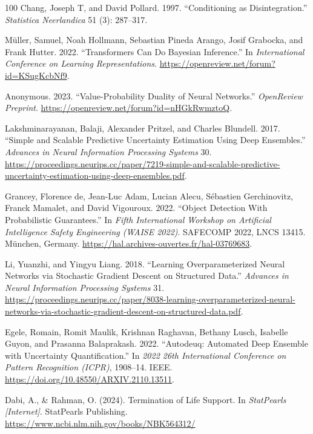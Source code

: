 \documentclass[11pt]{book}
\begin{document}
\begin{thebibliography}{100}
 Chang, Joseph T, and David Pollard. 1997. {``Conditioning as
Disintegration.''} \emph{Statistica Neerlandica} 51 (3): 287--317.

 Müller, Samuel, Noah Hollmann, Sebastian Pineda Arango, Josif Grabocka,
and Frank Hutter. 2022. {``Transformers Can Do Bayesian Inference.''} In
\emph{International Conference on Learning Representations}.
\url{https://openreview.net/forum?id=KSugKcbNf9}.

 Anonymous. 2023. {``Value-Probability Duality of Neural Networks.''}
\emph{OpenReview Preprint}.
\url{https://openreview.net/forum?id=nHGkRwmztoQ}.

 Lakshminarayanan, Balaji, Alexander Pritzel, and Charles Blundell. 2017.
{``Simple and Scalable Predictive Uncertainty Estimation Using Deep
Ensembles.''} \emph{Advances in Neural Information Processing Systems}
30.
\url{https://proceedings.neurips.cc/paper/7219-simple-and-scalable-predictive-uncertainty-estimation-using-deep-ensembles.pdf}.

 Grancey, Florence de, Jean-Luc Adam, Lucian Alecu, Sébastien
Gerchinovitz, Franck Mamalet, and David Vigouroux. 2022. {``Object
Detection With Probabilistic Guarantees.''} In \emph{Fifth International
Workshop on Artificial Intelligence Safety Engineering (WAISE 2022)}.
SAFECOMP 2022, LNCS 13415. München, Germany.
\url{https://hal.archives-ouvertes.fr/hal-03769683}.

 Li, Yuanzhi, and Yingyu Liang. 2018. {``Learning Overparameterized
Neural Networks via Stochastic Gradient Descent on Structured Data.''}
\emph{Advances in Neural Information Processing Systems} 31.
\url{https://proceedings.neurips.cc/paper/8038-learning-overparameterized-neural-networks-via-stochastic-gradient-descent-on-structured-data.pdf}.

 Egele, Romain, Romit Maulik, Krishnan Raghavan, Bethany Lusch, Isabelle
Guyon, and Prasanna Balaprakash. 2022. {``Autodeuq: Automated Deep
Ensemble with Uncertainty Quantification.''} In \emph{2022 26th
International Conference on Pattern Recognition (ICPR)}, 1908--14. IEEE.
\url{https://doi.org/10.48550/ARXIV.2110.13511}.

 Dabi, A., \& Rahman, O. (2024). Termination of Life Support. In
\emph{StatPearls {[}Internet{]}}. StatPearls Publishing.
\url{https://www.ncbi.nlm.nih.gov/books/NBK564312/}


\end{thebibliography}
\end{document}
